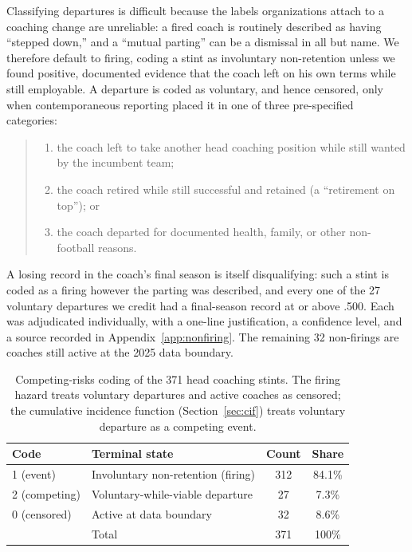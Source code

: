 \documentclass[USenglish]{article}
\theoremstyle{dgthm}
\theoremstyle{dgdef}
\begin{document}
Classifying departures is difficult because the labels organizations attach to a coaching change are unreliable: a fired coach is routinely described as having ``stepped down,'' and a ``mutual parting'' can be a dismissal in all but name. We therefore default to firing, coding a stint as involuntary non-retention unless we found positive, documented evidence that the coach left on his own terms while still employable. A departure is coded as voluntary, and hence censored, only when contemporaneous reporting placed it in one of three pre-specified categories:
\begin{quote}
\begin{enumerate}
\item[(A)] the coach left to take another head coaching position while still wanted by the incumbent team;
\item[(B)] the coach retired while still successful and retained (a ``retirement on top''); or
\item[(C)] the coach departed for documented health, family, or other non-football reasons.
\end{enumerate}
\end{quote}
A losing record in the coach's final season is itself disqualifying: such a stint is coded as a firing however the parting was described, and every one of the 27 voluntary departures we credit had a final-season record at or above .500. Each was adjudicated individually, with a one-line justification, a confidence level, and a source recorded in Appendix~\ref{app:nonfiring}. The remaining 32 non-firings are coaches still active at the 2025 data boundary.

\begin{table}[!ht]
\caption{Competing-risks coding of the 371 head coaching stints. The firing hazard treats voluntary departures and active coaches as censored; the cumulative incidence function (Section~\ref{sec:cif}) treats voluntary departure as a competing event.}
\label{tab:events}
\small
\begin{tabular}{llcc}
\toprule
Code & Terminal state & Count & Share \\
\midrule
1 (event) & Involuntary non-retention (firing) & 312 & 84.1\% \\
2 (competing) & Voluntary-while-viable departure & 27 & 7.3\% \\
0 (censored) & Active at data boundary & 32 & 8.6\% \\
\midrule
& Total & 371 & 100\% \\
\bottomrule
\end{tabular}
\end{table}
\end{document}
